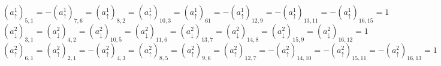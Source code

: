 \begin{equation*}
	(a^1_\uparrow)_{5,1}=-(a^1_\uparrow)_{7,6}=(a^1_\uparrow)_{8,2}=(a^1_\uparrow)_{10,3}=(a^1_\uparrow)_{61}=-(a^1_\uparrow)_{12,9}=-(a^1_\uparrow)_{13,11}=-(a^1_\uparrow)_{16,15}=1
\end{equation*}
\begin{equation*}
	(a^2_\downarrow)_{3,1}=(a^2_\downarrow)_{4,2}=(a^2_\downarrow)_{10,5}=(a^2_\downarrow)_{11,6}=(a^2_\downarrow)_{13,7}=(a^2_\downarrow)_{14,8}=(a^2_\downarrow)_{15,9}=(a^2_\downarrow)_{16,12}=1
\end{equation*}
\begin{equation*}
	(a^2_\uparrow)_{6,1} =(a^2_\uparrow)_{2,1}=-(a^2_\uparrow)_{4,3}=(a^2_\uparrow)_{8,5}=(a^2_\uparrow)_{9,6}=(a^2_\uparrow)_{12,7}=-(a^2_\uparrow)_{14,10}=-(a^2_\uparrow)_{15,11}=-(a^2_\uparrow)_{16,13}=1
\end{equation*}

